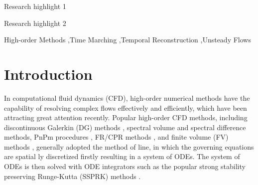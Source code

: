 \documentclass[preprint,12pt]{elsarticle}
\begin{document}
\begin{frontmatter}
\begin{abstract}
        

    \end{abstract}


    \begin{highlights}
        \item Research highlight 1
        \item Research highlight 2
    \end{highlights}

    \begin{keyword}

        High-order Methods \sep Time Marching \sep Temporal Reconstruction \sep Unsteady Flows



    \end{keyword}

\end{frontmatter}



\newcommand{\trans}{^\mathrm{T}}

\section{Introduction}
\label{sec:intro}

In computational fluid dynamics (CFD),
high-order numerical methods have the capability of
resolving complex flows effectively and efficiently,
which have been attracting great attention recently.
Popular high-order CFD methods, including discontinuous
Galerkin (DG) methods
\cite{reed1973triangularDG,
    BASSI1997251DG,
    BASSI1997267DG,
    cockburn1989DGII,
    cockburn2001rungeDG},
spectral volume
\cite{WANG2002210_SV}
and spectral difference
\cite{LIU2006780_SD} methods,
PnPm procedures
\cite{DUMBSER20088209_PNPM},
FR/CPR methods
\cite{huynh2007flux_FR,
    huynh2009reconstruction_FR,
    vincent2011new_FR,
    wang2009unifying_CPR},
and finite volume (FV) methods
\cite{wang2016compact_VR,
    wang2016compact1_VR,
    wang2017compact_VR,
    pan2018high_VR,
    zhang2019compact_VR,
    barth1990higher_FV,
    delanaye1999quadratic_FV,
    ollivier1997quasi_ENO,
    friedrich1998weighted_WENO,
    hu1999weighted_WENO,
    dumbser2007quadrature_WENO},
generally adopted the method of line, 
in which the governing equations 
are spatial ly discretized firstly 
resulting in a system of ODEs.
The system of ODEs is then
solved with
ODE integrators such as the
popular strong stability preserving
Runge-Kutta (SSPRK) methods
\cite{gottlieb2001strong_SSPRK}.
\end{document}
